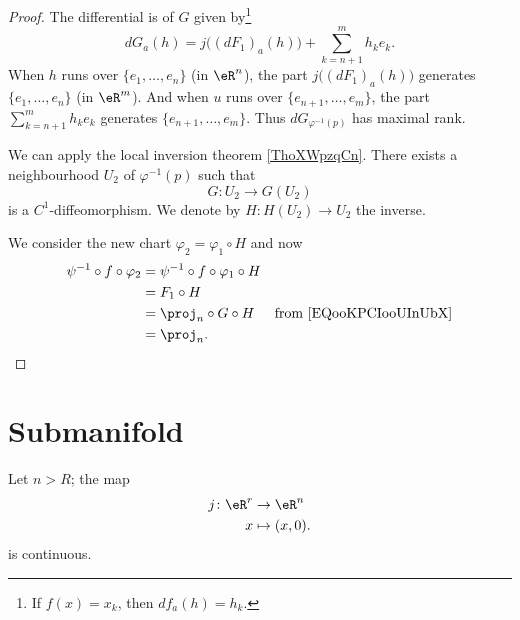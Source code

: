 \begin{proof}
	The differential is of \( G\) given by\footnote{If \( f(x)=x_k\), then \( df_a(h)=h_k\).}
	\begin{equation}
		dG_a(h)=j\big( (dF_1)_{a}(h) \big)+\sum_{k=n+1}^mh_ke_k.
	\end{equation}
	When \( h\) runs over \( \{ e_1,\ldots,e_n \}\) (in \( \eR^n\)), the part \( j\big( (dF_1)_a(h) \big)\) generates \( \{ e_1,\ldots,e_n \}\) (in \( \eR^m\)). And when \( u\) runs over \( \{ e_{n+1},\ldots,e_m \}\), the part \( \sum_{k=n+1}^mh_ke_k\) generates \( \{ e_{n+1},\ldots,e_m \}\). Thus \( dG_{\varphi^{-1}(p)}\) has maximal rank.

	We can apply the local inversion theorem \ref{ThoXWpzqCn}. There exists a neighbourhood \( U_2\) of \( \varphi^{-1}(p)\) such that
	\begin{equation}
		G \colon U_2\to G(U_2)
	\end{equation}
	is a \( C^1\)-diffeomorphism. We denote by \(H \colon H(U_2)\to U_2  \) the inverse.

	We consider the new chart \( \varphi_2=\varphi_1\circ H\) and now
	\begin{subequations}
		\begin{align}
			\psi^{-1}\circ f\circ \varphi_2 & =\psi^{-1}\circ f\circ \varphi_1\circ H                                        \\
			                                & =F_1\circ H                                                                    \\
			                                & =\proj_n\circ G\circ H                  & \text{from \eqref{EQooKPCIooUInUbX}} \\
			                                & =\proj_n.
		\end{align}
	\end{subequations}
\end{proof}



\section{Submanifold}


\begin{lemma}	\label{LEMooUBLWooXnPzjn}
	Let \( n>R\); the map
	\begin{equation}
		\begin{aligned}
			j\colon \eR^r & \to \eR^n      \\
			x             & \mapsto (x,0).
		\end{aligned}
	\end{equation}
	is continuous.
\end{lemma}

